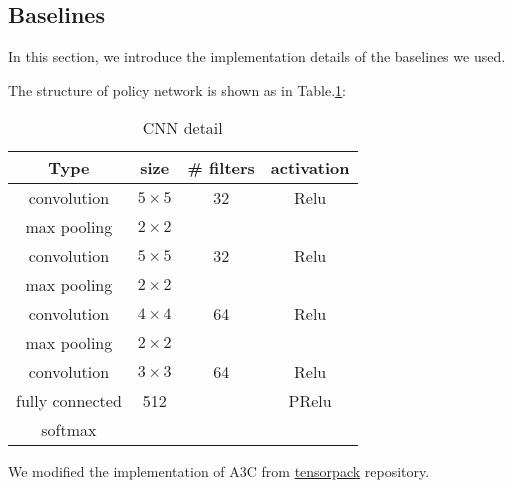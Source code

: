 \subsection{Baselines}

In this section, we introduce the implementation details of the baselines we used.

The structure of policy network is shown as in Table.\ref{table.cnn_detail}:

\begin{table}[!ht]
	\centering
	\caption{CNN detail}
	\label{table.cnn_detail}
	\begin{tabular}{c|c|c|c}
		\textbf{Type} & \textbf{size} & \textbf{\# filters} & \textbf{activation} \\ \hline
		convolution & $5\times5$ & 32 & Relu \\ 
		max pooling & $2\times2$ &  &  \\
		convolution & $5\times5$ & 32 & Relu \\
		max pooling & $2\times2$ &  &  \\
		convolution & $4\times4$ & 64 & Relu \\
		max pooling & $2\times2$ &  &  \\
		convolution & $3\times3$ & 64 & Relu \\
		fully connected & 512 &  & PRelu \\
		softmax &  &  & 
	\end{tabular}
\end{table}
We modified the implementation of A3C from \href{https://github.com/ppwwyyxx/tensorpack}{tensorpack} repository.



